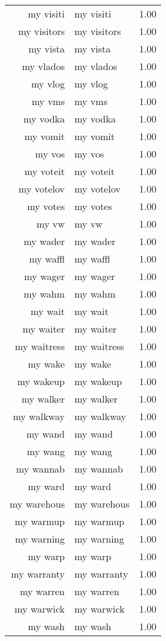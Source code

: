 \begin{table}[ht]
\begin{tabular}{rlr}
  my visiti & my visiti & 1.00 \\ 
  my visitors & my visitors & 1.00 \\ 
  my vista & my vista & 1.00 \\ 
  my vlados & my vlados & 1.00 \\ 
  my vlog & my vlog & 1.00 \\ 
  my vms & my vms & 1.00 \\ 
  my vodka & my vodka & 1.00 \\ 
  my vomit & my vomit & 1.00 \\ 
  my vos & my vos & 1.00 \\ 
  my voteit & my voteit & 1.00 \\ 
  my votelov & my votelov & 1.00 \\ 
  my votes & my votes & 1.00 \\ 
  my vw & my vw & 1.00 \\ 
  my wader & my wader & 1.00 \\ 
  my waffl & my waffl & 1.00 \\ 
  my wager & my wager & 1.00 \\ 
  my wahm & my wahm & 1.00 \\ 
  my wait & my wait & 1.00 \\ 
  my waiter & my waiter & 1.00 \\ 
  my waitress & my waitress & 1.00 \\ 
  my wake & my wake & 1.00 \\ 
  my wakeup & my wakeup & 1.00 \\ 
  my walker & my walker & 1.00 \\ 
  my walkway & my walkway & 1.00 \\ 
  my wand & my wand & 1.00 \\ 
  my wang & my wang & 1.00 \\ 
  my wannab & my wannab & 1.00 \\ 
  my ward & my ward & 1.00 \\ 
  my warehous & my warehous & 1.00 \\ 
  my warmup & my warmup & 1.00 \\ 
  my warning & my warning & 1.00 \\ 
  my warp & my warp & 1.00 \\ 
  my warranty & my warranty & 1.00 \\ 
  my warren & my warren & 1.00 \\ 
  my warwick & my warwick & 1.00 \\ 
  my wash & my wash & 1.00 \\ 

\end{tabular}
\end{table}
